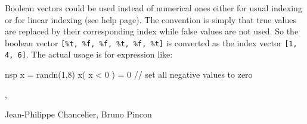 
Boolean vectors could be used instead of numerical ones either for usual 
indexing or for linear indexing (see  help page). 
The convention is simply that true values are replaced by their corresponding index while 
false values are not used. So the boolean vector \verb+[%t, %f, %f, %t, %f, %t]+ is 
converted as the index vector \verb+[1, 4, 6]+. The actual usage is for expression like:
\begin{mintednsp}{nsp}
     x = randn(1,8)
     x( x < 0 ) = 0  // set all negative values to zero
\end{mintednsp}
 

\begin{manseealso}
, 
\end{manseealso}

\begin{authors}
   Jean-Philippe Chancelier, Bruno Pincon
\end{authors}
